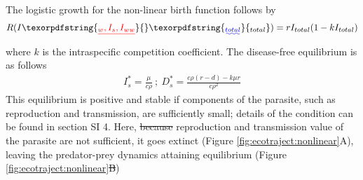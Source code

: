 \documentclass[a4paper]{scrartcl}
\providecommand{\DIFaddtex}[1]{{\protect\color{blue}\uwave{#1}}} %
\providecommand{\DIFdeltex}[1]{{\protect\color{red}\sout{#1}}}                      %
\providecommand{\DIFaddbegin}{} %
\providecommand{\DIFaddend}{} %
\providecommand{\DIFdelbegin}{} %
\providecommand{\DIFdelend}{} %
\providecommand{\DIFadd}[1]{\texorpdfstring{\DIFaddtex{#1}}{#1}} %
\providecommand{\DIFdel}[1]{\texorpdfstring{\DIFdeltex{#1}}{}} %
\newcommand{\DIFscaledelfig}{0.5}
\newlength{\DIFdelgraphicswidth} %
\newlength{\DIFdelgraphicsheight} %
\newcommand{\DIFaddincludegraphics}[2][]{{\color{blue}\fbox{\DIFOincludegraphics[#1]{#2}}}} %
\newcommand{\DIFdelincludegraphics}[2][]{%
\sbox{\DIFdelgraphicsbox}{\DIFOincludegraphics[#1]{#2}}%
\settoboxwidth{\DIFdelgraphicswidth}{\DIFdelgraphicsbox} %
\settoboxtotalheight{\DIFdelgraphicsheight}{\DIFdelgraphicsbox} %
\scalebox{\DIFscaledelfig}{%
\parbox[b]{\DIFdelgraphicswidth}{\usebox{\DIFdelgraphicsbox}\\[-\baselineskip] \rule{\DIFdelgraphicswidth}{0em}}\llap{\resizebox{\DIFdelgraphicswidth}{\DIFdelgraphicsheight}{%
\setlength{\unitlength}{\DIFdelgraphicswidth}%
\begin{picture}(1,1)%
\thicklines\linethickness{2pt} %
{\color[rgb]{1,0,0}\put(0,0){\framebox(1,1){}}}%
{\color[rgb]{1,0,0}\put(0,0){\line( 1,1){1}}}%
{\color[rgb]{1,0,0}\put(0,1){\line(1,-1){1}}}%
\end{picture}%
}\hspace*{3pt}}} %
} %
\DeclareRobustCommand{\DIFaddbegin}{\DIFOaddbegin \let\includegraphics\DIFaddincludegraphics} %
\DeclareRobustCommand{\DIFaddend}{\DIFOaddend \let\includegraphics\DIFOincludegraphics} %
\DeclareRobustCommand{\DIFdelbegin}{\DIFOdelbegin \let\includegraphics\DIFdelincludegraphics} %
\DeclareRobustCommand{\DIFdelend}{\DIFOaddend \let\includegraphics\DIFOincludegraphics} %
\begin{document}
The logistic growth for the non-linear birth function follows by 
%
\begin{align*}
R(I\DIFdelbegin \DIFdel{_w, I_s,I_{ww}}\DIFdelend \DIFaddbegin \DIFadd{_{total}}\DIFaddend ) = r I_{total} (1 - k I_{total})
\end{align*}
%
where $k$ is the intraspecific competition coefficient. 
The disease-free equilibrium is as follows\DIFaddbegin \DIFadd{,
}\DIFaddend %
\begin{align*}
I_s^* = \frac{\mu}{c \rho } \ ;\  D_s^* = \frac{c \rho  (r-d) - k \mu  r}{c \rho ^2}
\end{align*}
%
This equilibrium is positive and stable if components of the parasite, such as reproduction and transmission, are sufficiently small; details of the condition can be found in section SI 4. 
Here, \DIFdelbegin \DIFdel{because }\DIFdelend \DIFaddbegin \DIFadd{as }\DIFaddend reproduction and transmission value of the parasite are not sufficient, it goes extinct (Figure \ref{fig:ecotraject:nonlinear}A\DIFaddbegin \DIFadd{, B}\DIFaddend ), leaving the predator-prey dynamics attaining equilibrium (Figure \ref{fig:ecotraject:nonlinear}\DIFdelbegin \DIFdel{B}\DIFdelend \DIFaddbegin \DIFadd{C, D}\DIFaddend )
\end{document}
